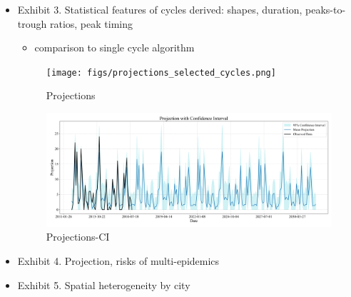 \documentclass{article}
\begin{document}
\begin{itemize}
    \item Exhibit 3. Statistical features of cycles derived:  shapes, duration, peaks-to-trough ratios, peak timing
        \begin{itemize}
            \item comparison to single cycle algorithm
        \end{itemize}

    \begin{figure}[htbp]
      \centering
      \texttt{[image: figs/projections\_selected\_cycles.png]}
      \caption{Projections}
      \label{fig_3_1}
    \end{figure}    
    
    \begin{figure}[htbp]
      \centering
      \includegraphics[width=1.0\textwidth]{figs/projections_confidence_interval.png}
      \caption{Projections-CI}
      \label{fig_3_2}
    \end{figure}    

    

        
    \item Exhibit 4. Projection, risks of multi-epidemics
    \item Exhibit 5. Spatial heterogeneity by city
\end{itemize}


\end{document}
